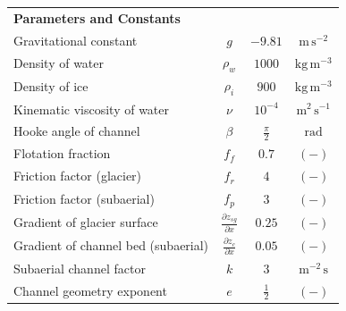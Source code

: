 \documentclass[11pt]{article}
\newcommand{\unit}[1]{$\mathrm{#1}$}
\begin{document}
\begin{spacing}{1}
\begin{table}[H]
\begin{tabular}{ l  c  c c }
      \textbf{Parameters and Constants}  & & &\\
      Gravitational constant&$g$& $-9.81$&$\mathrm{m\,s^{-2}}$\\
      Density of water & $\rho_w$& $1000$ & $\mathrm{kg\,m^{-3}}$ \\
      Density of ice & $\rho_i$& $900$ & $\mathrm{kg\,m^{-3}}$ \\
      Kinematic viscosity of water &$\nu$& $10^{-4}$& $\mathrm{m^2\,s^{-1}}$\\
      Hooke angle of channel & $\beta$ & $\frac{\pi}{2}$ & \unit{rad}\\
      Flotation fraction & $f_f$&$0.7$& $\mathrm{(-)}$\\
      Friction factor (glacier) & $f_r$ & $4$ & $\mathrm{(-)}$ \\
      Friction factor (subaerial) & $f_p$ & $3$ & $\mathrm{(-)}$\\
      Gradient of glacier surface & $\frac{\partial z_{sg}}{\partial x}$ &$0.25$& $\mathrm{(-)}$\\
      Gradient of channel bed (subaerial) &$\frac{\partial z_c}{\partial x}$ &$0.05$& $\mathrm{(-)}$\\
      Subaerial channel factor & $k$ &$3$ & $\mathrm{m^{-2}\, s}$\\
      Channel geometry exponent &$e$& $\frac{1}{2}$&$\mathrm{(-)}$ \\
      \hline
    \end{tabular}
    \label{table:vpm}
  \end{table}
  

\end{spacing}
\end{document}
